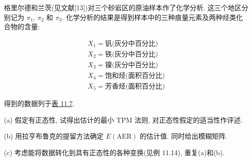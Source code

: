 
\quad 格里尔德和兰茨(见文献[13])对三个砂岩区的原油样本作了化学分析. 这三个地区分别记为 $\pi_1$, $\pi_2$ 和 $\pi_3$. 化学分析的结果是得到样本中的三种痕量元素及两种烃类化合物的含量:

\[
\begin{gathered}
X_1=\text{钒(灰分中百分比)}\\
X_2=\text{铁(灰分中百分比)}\\
X_3=\text{镍(灰分中百分比)}\\
X_4=\text{饱和烃(面积百分比)}\\
X_5=\text{芳香烃(面积百分比)}
\end{gathered}
\]

得到的数据列于\hyperref[tab:11.7]{表 11.7}.

(a) 假定有正态性, 试得出估计的最小 TPM 法则, 对正态性假定的适当性作评述.

(b) 用拉亨布鲁克的提留方法确定 $E(\mathrm{AER})$ 的估计值. 同时给出模糊矩阵.

(c) 考虑能将数据转化到具有正态性的各种变换(见例 11.14), 重复(a)和(b).

